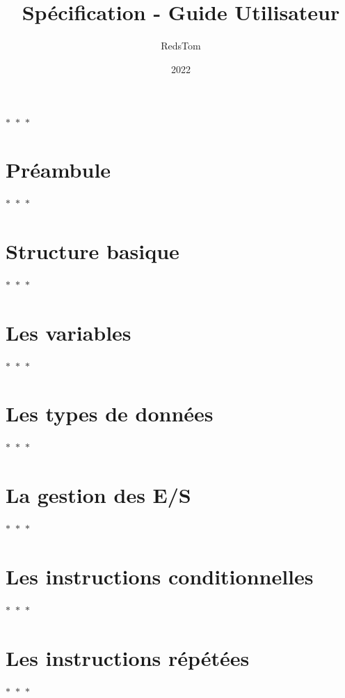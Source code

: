 \documentclass{article}
\title{\lang \\\large Spécification - Guide Utilisateur}
\author{RedsTom}
\date{2022}
\newcommand{\sep}{
    \begin{center}
        $\ast$~$\ast$~$\ast$
    \end{center}
}
\newcommand{\csection}[2]{\section{#1}\label{sec:#2}\parindent\sep}
\begin{document}
    \maketitle
    \tableofcontents

    \vspace{.5cm}
    \sep
    \vspace{.5cm}

    \begin{multicols}{2}

        \section*{Préambule} \label{sec:preambule}
        \parindent
        
        \sep

        \csection{Structure basique}{structure-basique}
        \csection{Les variables}{variables}
        \csection{Les types de données}{types-de-donnees}
        \csection{La gestion des E/S}{gestion-des-e-s}
        \csection{Les instructions conditionnelles}{instructions-conditionnelles}
        \csection{Les instructions répétées}{instructions-repetitives}

    \end{multicols}
\end{document}
